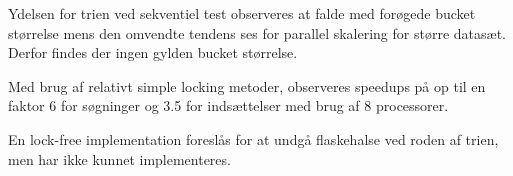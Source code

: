 Ydelsen for trien ved sekventiel test observeres at falde med forøgede bucket størrelse
mens den omvendte tendens ses for parallel skalering for større datasæt. Derfor
findes der ingen gylden bucket størrelse.

Med brug af relativt simple locking metoder, observeres speedups på op til en
faktor 6 for søgninger og 3.5 for indsættelser med brug af 8 processorer.

En lock-free implementation foreslås for at undgå flaskehalse ved
roden af trien, men har ikke kunnet implementeres.

